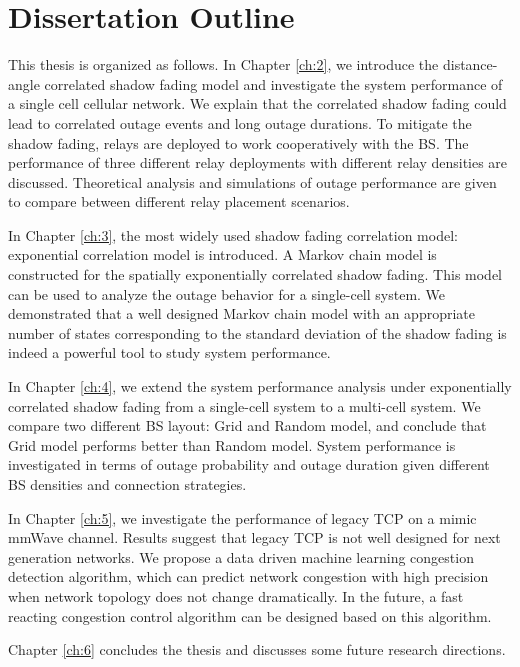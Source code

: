 \section{Dissertation Outline}
\par This thesis is organized as follows. In Chapter \ref{ch:2}, we introduce the distance-angle correlated shadow fading model and investigate the system performance of a single cell cellular network. We explain that the correlated shadow fading could lead to correlated outage events and long outage durations. To mitigate the shadow fading, relays are deployed to work cooperatively with the BS. The performance of three different relay deployments with different relay densities are discussed. Theoretical analysis and simulations of outage performance are given to compare between different relay placement scenarios. 
\par In Chapter \ref{ch:3}, the most widely used shadow fading correlation model: exponential correlation model is introduced. A Markov chain model is constructed for the spatially exponentially correlated shadow fading. This model can be used to analyze the outage behavior for a single-cell system. We demonstrated that a well designed Markov chain model with an appropriate number of states corresponding to the standard deviation of the shadow fading is indeed a powerful tool to study system performance.
\par In Chapter \ref{ch:4}, we extend the system performance analysis under exponentially correlated shadow fading from a single-cell system to a multi-cell system. We compare two different BS layout: Grid and Random model, and conclude that Grid model performs better than Random model. System performance is investigated in terms of outage probability and outage duration given different BS densities and connection strategies. 
\par In Chapter \ref{ch:5}, we investigate the performance of legacy TCP on a mimic mmWave channel. Results suggest that legacy TCP is not well designed for next generation networks. We propose a data driven machine learning congestion detection algorithm, which can predict network congestion with high precision when network topology does not change dramatically. In the future, a fast reacting congestion control algorithm can be designed based on this algorithm.
\par Chapter \ref{ch:6} concludes the thesis and discusses some future research directions.








